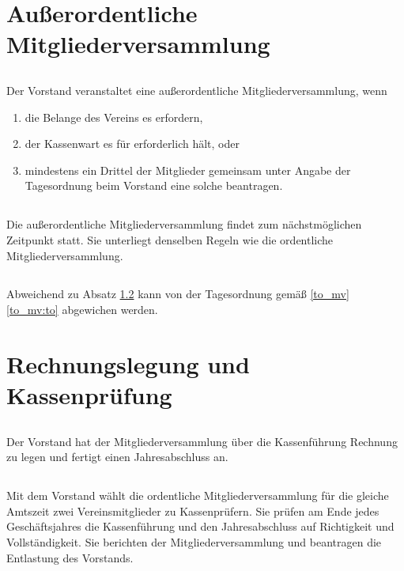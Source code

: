 \documentclass[12pt]{article}
\begin{document}
\section{Außerordentliche Mitgliederversammlung}
\label{aus_mv}
\subsection{}
Der Vorstand veranstaltet eine außerordentliche Mitgliederversammlung, wenn
\begin{enumerate}
    \item die Belange des Vereins es erfordern,
    \item der Kassenwart es für erforderlich hält, oder
    \item mindestens ein Drittel der Mitglieder gemeinsam unter Angabe der Tagesordnung beim Vorstand eine solche beantragen.
\end{enumerate}
\subsection{}
\label{aus_mv:2}
Die außerordentliche Mitgliederversammlung findet zum nächstmöglichen Zeitpunkt statt. Sie unterliegt denselben Regeln wie die ordentliche Mitgliederversammlung.
\subsection{}
Abweichend zu Absatz \ref{aus_mv:2} kann von der Tagesordnung gemäß \ref{to_mv} \ref{to_mv:to} abgewichen werden.

\section{Rechnungslegung und Kassenprüfung}
\subsection{}
Der Vorstand hat der Mitgliederversammlung über die Kassenführung Rechnung zu legen und fertigt einen Jahresabschluss an.
\subsection{}
Mit dem Vorstand wählt die ordentliche Mitgliederversammlung für die gleiche Amtszeit zwei Vereinsmitglieder zu Kassenprüfern. Sie prüfen am Ende jedes Geschäftsjahres die Kassenführung und den Jahresabschluss auf Richtigkeit und Vollständigkeit. Sie berichten der Mitgliederversammlung und beantragen die Entlastung des Vorstands.
\end{document}
